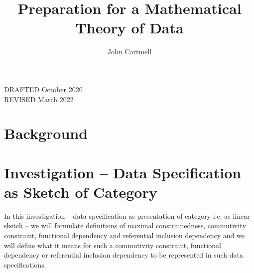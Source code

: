 \documentclass[10pt,a4paper]{article}
\theoremstyle{remark}
\begin{document}
\title{Preparation for a Mathematical Theory of Data}


\author{John Cartmell}

\date{}

\maketitle

\begin{center}
DRAFTED October 2020 \\
REVISED March 2022
\end{center}

\newcommand{\seenudgeup}[1]{\rule{0.1cm}{#1}}
\newcommand{\seenudgedown}[1]{\rule[-#1]{0.1cm}{0.1cm}}
\newcommand{\nudgeup}[1]{\rule{0cm}{#1}}
\newcommand{\nudgedown}[1]{\rule[-#1]{0cm}{0.1cm}}

\newcommand{\paralleldiag}[4]
{
 $
\rule[-0.3cm]{0pt}{0.9cm} %
\begin{array}{c p{0.5cm} c  }
 \Rnode{a}{#1}     &&   \Rnode{b}{#2}
\end{array} 
\begin{arrows}
\ncarc[nodesep=2pt,arcangle=10,offset=2pt]{->}{a}{b}
\alabel{#3}
\ncarc[nodesep=2pt,arcangle=-10,offset=-2pt]{->}{a}{b}
\blabel{#4}
\end{arrows}
$  
}


\newcommand{\sourcediag}[5]{
$
\begin{array}{c p{0.5cm} c  }
             &&   \Rnode{b}{#2} \\[0.01cm]
\Rnode{a}{#1} &&                \\[0.01cm] 
             &&   \Rnode{c}{#3} 
\end{array} 
\begin{arrows}
\ncarr{a}{b}
\alabel{#4}
\ncarr{a}{c}
\blabel{#5}
\end{arrows}
$  
}
\newcommand{\fgsourcediag}{\sourcediag{a}{b}{c}{f}{g}}


\section{Background}
\iffalse


\section{Investigation -- Data Specification as Sketch of Category}
\note
In this investigation -- data specification as presentation of category i.e. as linear sketch \cite{BarrandWells}-- we will formulate 
definitions of maximal constrainedness, commutivity constraint, functional dependency and referential inclusion dependency
and we will define what it means for such a commutivity constraint, functional dependency or  referential inclusion dependency to be represented in such data specifications.
\end{document}
